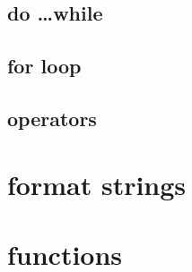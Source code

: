 \documentclass[10pt,graphics,aspectratio=169,table]{beamer}
\begin{document}
\subsection{do \ldots while}

\subsection{for loop}

\subsection{operators}

\section{format strings}

\section{functions}
\end{document}
